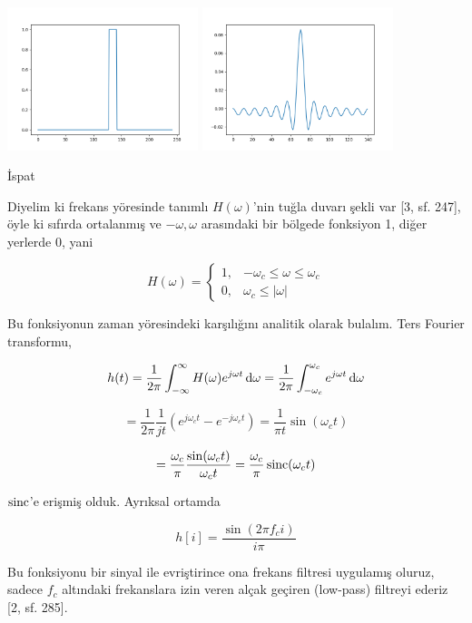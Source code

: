 \documentclass[12pt,fleqn]{article}\usepackage{../../common}
\begin{document}
\includegraphics[width=15em]{compscieng_1_24_02.png}
\includegraphics[width=15em]{compscieng_1_24_01.png}

İspat

Diyelim ki frekans yöresinde tanımlı $H(\omega)$'nin tuğla duvarı şekli var
[3, sf. 247], öyle ki sıfırda ortalanmış ve $-\omega,\omega$ arasındaki bir
bölgede fonksiyon 1, diğer yerlerde 0, yani

$$ H(\omega) = 
\left\{ \begin{array}{ll}
1, & -\omega_c \le \omega \le \omega_c \\
0, & \omega_c \le |\omega|
\end{array} \right.
$$

Bu fonksiyonun zaman yöresindeki karşılığını analitik olarak bulalım. Ters
Fourier transformu,

$$ 
h(t) = \frac{1}{2\pi}  \int _{-\infty}^{\infty} 
H(\omega) e ^{j\omega t} \,\mathrm{d} \omega = 
\frac{1}{2\pi} \int _{-\omega_c}^{\omega_c} e ^{j\omega t} \,\mathrm{d} \omega
$$

$$ 
= \frac{1}{2\pi} \frac{1}{jt} (e ^{j\omega_c t} - e ^{-j\omega_c t}) =
\frac{1}{\pi t} \sin(\omega_c t)
$$

$$ 
= \frac{\omega_c}{\pi} \frac{\sin(\omega_c t)}{\omega_c t} 
= \frac{\omega_c}{\pi} \operatorname{sinc}(\omega_c t)
$$

$\operatorname{sinc}$'e erişmiş olduk. Ayrıksal ortamda 

$$ h[i] = \frac{\sin(2\pi f_c i)}{i \pi}$$

Bu fonksiyonu bir sinyal ile evriştirince ona frekans filtresi uygulamış
oluruz, sadece $f_c$ altındaki frekanslara izin veren alçak geçiren
(low-pass) filtreyi ederiz [2, sf. 285].
\end{document}
